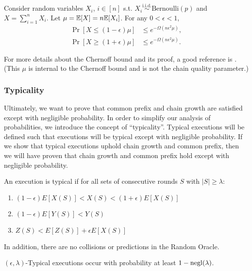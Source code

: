 \begin{theorem}
Consider random variables ${X_i}$, ${i\in [n]}$ s.t. $X_i \overset{\text{i.i.d.}}{\sim} \mathrm{Bernoulli}(p)$ and $X = \sum_{i=1}^{n} X_i$. Let $\mu = \mathbb{E}[X] = n \mathbb{E}[X_i]$. For any $0 < \epsilon < 1$,
\begin{align}
    \Pr[X \leq (1 - \epsilon) \mu ] &\leq e^{-\Omega(n\epsilon^2\mu)}, \\
    \Pr[X \geq (1 + \epsilon) \mu ] &\leq e^{-\Omega(n\epsilon^2\mu)}.
\end{align}
\end{theorem}
For more details about the Chernoff bound and its proof, a good reference is \cite{chernoff1952measure}.
(This $\mu$ is internal to the Chernoff bound and is not the chain quality parameter.)


\subsubsection{Typicality}

Ultimately, we want to prove that common prefix and chain growth are satisfied except with negligible probability. In order to simplify our analysis of probabilities, we introduce the concept of ``typicality''. Typical executions will be defined such that executions will be typical except with negligible probability. If we show that typical executions uphold chain growth and common prefix, then we will have proven that chain growth and common prefix hold except with negligible probability.

\begin{definition}
An execution is typical if for all sets of consecutive rounds $S$ with $|S| \geq \lambda$:
\begin{enumerate}
    \item $(1-\epsilon) E[X(S)] < X(S) < (1+\epsilon) E[X(S)]$
    \item $(1-\epsilon) E[Y(S)] < Y(S) $
    \item $ Z(S) < E[Z(S)] + \epsilon E[X(S)] $
\end{enumerate}
In addition, there are no collisions or predictions in the Random Oracle.
\end{definition}

\begin{theorem}
$(\epsilon,\lambda)$-Typical executions occur with probability at least $1-\mathrm{negl}(\lambda)$.
\end{theorem}

